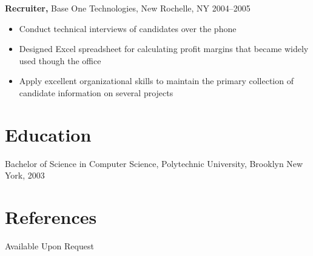 \documentclass[margin]{res}
\begin{document}
\begin{resume}
{\bf Recruiter,} Base One Technologies, New Rochelle, NY \hfill 2004--2005
\begin{itemize}
  \item Conduct technical interviews of candidates over the phone
  \item Designed Excel spreadsheet for calculating profit margins that became widely used though the office
  \item Apply excellent organizational skills to maintain the primary collection of candidate information on several projects
\end{itemize}

\section{Education}
Bachelor of Science in Computer Science, Polytechnic University, Brooklyn New
York, 2003

\section{References}
Available Upon Request

\end{resume}
\end{document}
